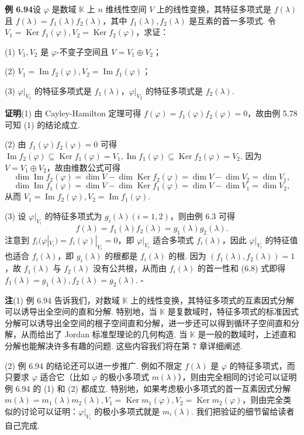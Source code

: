 \documentclass[UTF8, 12pt, fontset=fandol, oneside]{ctexart}
\begin{document}
\noindent\textbf{例 6.94}\quad 设 $\varphi$ 是数域 $\mathbb{K}$ 上 $n$ 维线性空间 $V$ 上的线性变换，其特征多项式是 $f(\lambda)$ 且 $f(\lambda)=f_1(\lambda)f_2(\lambda)$，其中 $f_1(\lambda),f_2(\lambda)$ 是互素的首一多项式. 令 $V_1=\operatorname{Ker}f_1(\varphi),V_2=\operatorname{Ker}f_2(\varphi)$，求证：

(1) $V_1,V_2$ 是 $\varphi$-不变子空间且 $V=V_1\oplus V_2$；

(2) $V_1=\operatorname{Im}f_2(\varphi),V_2=\operatorname{Im}f_1(\varphi)$；

(3) $\varphi|_{V_1}$ 的特征多项式是 $f_1(\lambda)$，$\varphi|_{V_2}$ 的特征多项式是 $f_2(\lambda)$.

\noindent\textbf{证明}\quad (1) 由 Cayley-Hamilton 定理可得 $f(\varphi)=f_1(\varphi)f_2(\varphi)=0$，故由例 5.78 可知 (1) 的结论成立.

(2) 由 $f_1(\varphi)f_2(\varphi)=0$ 可得 $\operatorname{Im}f_2(\varphi)\subseteq \operatorname{Ker}f_1(\varphi)=V_1,\operatorname{Im}f_1(\varphi)\subseteq\operatorname{Ker}f_2(\varphi)=V_2$. 因为 $V=V_1\oplus V_2$，故由维数公式可得
\[
\dim\operatorname{Im}f_2(\varphi)=\dim V-\dim\operatorname{Ker}f_2(\varphi)=\dim V-\dim V_2=\dim V_1,
\]
\[
\dim\operatorname{Im}f_1(\varphi)=\dim V-\dim\operatorname{Ker}f_1(\varphi)=\dim V-\dim V_1=\dim V_2,
\]
从而 $V_1=\operatorname{Im}f_2(\varphi),V_2=\operatorname{Im}f_1(\varphi)$.

(3) 设 $\varphi|_{V_i}$ 的特征多项式为 $g_i(\lambda)(i=1,2)$，则由例 6.3 可得
\begin{equation}
f(\lambda)=f_1(\lambda)f_2(\lambda)=g_1(\lambda)g_2(\lambda). \tag{6.8}
\end{equation}
注意到 $f_i(\varphi|_{V_i})=f_i(\varphi)|_{V_i}=0$，即 $\varphi|_{V_i}$ 适合多项式 $f_i(\lambda)$，因此 $\varphi|_{V_i}$ 的特征值也适合 $f_i(\lambda)$，即 $g_i(\lambda)$ 的根都是 $f_i(\lambda)$ 的根. 因为 $(f_1(\lambda),f_2(\lambda))=1$，故 $f_1(\lambda)$ 与 $f_2(\lambda)$ 没有公共根，从而由 $f_i(\lambda)$ 的首一性和 (6.8) 式即得 $f_1(\lambda)=g_1(\lambda),f_2(\lambda)=g_2(\lambda)$. $\square$

\noindent\textbf{注}\quad (1) 例 6.94 告诉我们，对数域 $\mathbb{K}$ 上的线性变换，其特征多项式的互素因式分解可以诱导出全空间的直和分解. 特别地，当 $\mathbb{K}$ 是复数域时，特征多项式的标准因式分解可以诱导出全空间的根子空间直和分解，进一步还可以得到循环子空间直和分解，从而给出了 Jordan 标准型理论的几何构造. 当 $\mathbb{K}$ 是一般的数域时，上述直和分解也能解决许多有趣的问题. 这些内容我们将在第 7 章详细阐述.

(2) 例 6.94 的结论还可以进一步推广. 例如不限定 $f(\lambda)$ 是 $\varphi$ 的特征多项式，而只要求 $\varphi$ 适合它（比如 $\varphi$ 的极小多项式 $m(\lambda)$），则由完全相同的讨论可以证明例 6.94 的 (1) 和 (2) 都成立. 特别地，如果考虑极小多项式的首一互素因式分解 $m(\lambda)=m_1(\lambda)m_2(\lambda),V_1=\operatorname{Ker}m_1(\varphi),V_2=\operatorname{Ker}m_2(\varphi)$，则由完全类似的讨论可以证明：$\varphi|_{V_i}$ 的极小多项式就是 $m_i(\lambda)$. 我们把验证的细节留给读者自己完成.
\end{document}
